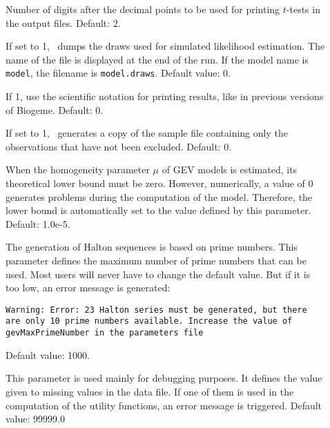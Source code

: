 \documentclass[12pt]{memoir}
\begin{document}
\begin{description}
\begin{description}
\item[] Number of digits after the decimal points to be used for printing $t$-tests in the output files. Default: 2.

      \item[] If set to 1, \BIOGEME\ dumps the draws used for 
         simulated likelihood estimation. The name of the file is displayed at the end of the run. 
         If the model name is \texttt{model}, the filename is \texttt{model.draws}. Default value: 0.

\item[] If 1, use the scientific notation for printing results, like in previous versions of Biogeme.  Default: 0.


\item[] If set to 1, \BIOGEME\
  generates a copy of the sample file containing only the observations
  that have not been excluded. Default: 0.


\item[] When the homogeneity parameter $\mu$
  of GEV models is estimated, its theoretical lower bound must be
  zero. However, numerically, a value of 0 generates problems during
  the computation of the model. Therefore, the lower bound is
  automatically set to the value defined by this parameter. Default: 1.0e-5.


      \item[] The generation of Halton sequences is based on prime 
         numbers. This parameter defines the maximum number of prime numbers that can be used. 
         Most users will never have to change the default value. But if it is too low, an error 
         message is generated:
         \begin{center}
            \texttt{Warning:  Error: 23 Halton series must be generated, but there are only 10 
            prime numbers available. Increase the value of gevMaxPrimeNumber in the parameters file}
         \end{center}
         Default value: 1000.

      \item[] This parameter is used mainly for
         debugging purposes. It defines the value given to missing values in
         the data file. If one of them is used in the computation of the
         utility functions, an error message is triggered. Default value: 99999.0


\end{description}
\end{description}
\end{document}
